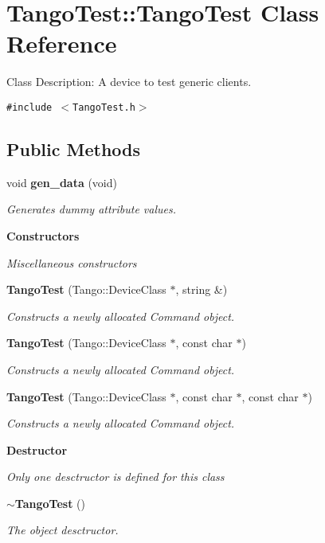\section{Tango\-Test::Tango\-Test  Class Reference}
\label{classTangoTest_1_1TangoTest}
Class Description: A device to test generic clients. 


{\tt \#include $<$Tango\-Test.h$>$}

\subsection*{Public Methods}
\begin{CompactItemize}
\item 
void {\bf gen\_\-data} (void)
\begin{CompactList}\small\item\em Generates dummy attribute values.\item\end{CompactList}\end{CompactItemize}
\begin{Indent}{\bf Constructors}\par
{\em Miscellaneous constructors}\begin{CompactItemize}
\item 
{\bf Tango\-Test} (Tango::Device\-Class $\ast$, string \&)
\begin{CompactList}\small\item\em Constructs a newly allocated Command object.\item\end{CompactList}\item 
{\bf Tango\-Test} (Tango::Device\-Class $\ast$, const char $\ast$)
\begin{CompactList}\small\item\em Constructs a newly allocated Command object.\item\end{CompactList}\item 
{\bf Tango\-Test} (Tango::Device\-Class $\ast$, const char $\ast$, const char $\ast$)
\begin{CompactList}\small\item\em Constructs a newly allocated Command object.\item\end{CompactList}\end{CompactItemize}
\end{Indent}
\begin{Indent}{\bf Destructor}\par
{\em Only one desctructor is defined for this class}\begin{CompactItemize}
\item 
{\bf $\sim$Tango\-Test} ()
\begin{CompactList}\small\item\em The object desctructor.\item\end{CompactList}\end{CompactItemize}
\end{Indent}
